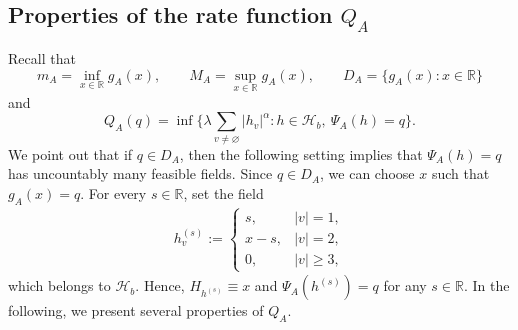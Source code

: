 \documentclass[a4paper, 11pt]{article}
\newcommand{\1}{\mathbf 1}
\theoremstyle{plain}
\begin{document}
\subsection{Properties of the rate function \texorpdfstring{\(Q_A\)}{QA}}\label{dtgxbgfdgge}

Recall that
\[
  m_A=\inf_{x\in\mathbb{R}}g_A(x),
  \qquad
  M_A=\sup_{x\in\mathbb{R}}g_A(x),
  \qquad
  D_A=\{g_A(x):x\in\mathbb{R}\}
\]
and
$$
 Q_A(q)
  =
  \inf\Big\{\lambda\sum_{v\neq\varnothing}|h_v|^\alpha:h\in\mathcal{H}_b,\ \Psi_A(h)=q\Big\}.
  $$
We point out that if
\(q\in D_A\), then the following setting implies that $\Psi_A(h)=q$ has uncountably many feasible fields. Since \(q\in D_A\), we can choose $x$ such that $g_A(x)=q.$ For every \(s\in\mathbb{R}\),
set the field
\begin{align}\label{rsgfdgty5y3}
  h_v^{(s)}:=
  \begin{cases}
    s,&|v|=1,\\
    x-s,&|v|=2,\\
    0,&|v|\geq3,
  \end{cases}
\end{align}
which belongs to \(\mathcal{H}_b\). Hence, \(H_{h^{(s)}}\equiv x\) and
\(\Psi_A(h^{(s)})=q\) for any \(s\in\mathbb{R}\). In the following, we present several properties of $Q_A$.
\end{document}

